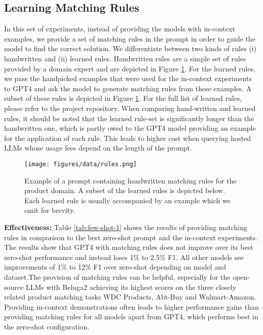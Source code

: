 \documentclass[sigconf,nonacm]{acmart}
\begin{document}
\subsection{Learning Matching Rules}
\label{subsec:rules}

 In this set of experiments, instead of providing the models with in-context examples, we provide a set of matching rules in the prompt in order to guide the model to find the correct solution. We differentiate between two kinds of rules (i) handwritten and (ii) learned rules. Handwritten rules are a simple set of rules provided by a domain expert and are depicted in Figure \ref{fig:rules}. For the learned rules, we pass the handpicked examples that were used for the in-context experiments to GPT4 and ask the model to generate matching rules from these examples. 
A subset of these rules is depicted in Figure \ref{fig:rules}. For the full list of learned rules, please refer to the project repository. When comparing hand-written and learned rules, it should be noted that the learned rule-set is significantly longer than the handwritten one, which is partly owed to the GPT4 model providing an example for the application of each rule. This leads to higher cost when querying hosted LLMs whose usage fees depend on the length of the prompt.

\begin{figure}[h]
  \centering
  \texttt{[image: figures/data/rules.png]}
  \caption{Example of a prompt containing handwritten matching rules for the product domain. A subset of the learned rules is depicted below. Each learned rule is usually accompanied by an example which we omit for brevity.}
  \label{fig:rules}
\end{figure} 
 \textbf{Effectiveness:} Table \ref{tab:few-shot-1} shows the results of providing matching rules in comparison to the best zero-shot prompt and the in-context experiments. The results show that GPT4 with matching rules does not improve over its best zero-shot performance and instead loses 1\% to 2.5\% F1. All other models see improvements of 1\% to 12\% F1 over zero-shot depending on model and dataset.The provision of matching rules can be helpful, especially for the open-source LLMs with Beluga2 achieving its highest scores on the three closely related product matching tasks WDC Products, Abt-Buy and Walmart-Amazon. Providing in-context demonstrations often leads to higher performance gains than providing matching rules for all models apart from GPT4, which performs best in the zero-shot configuration.
\end{document}
